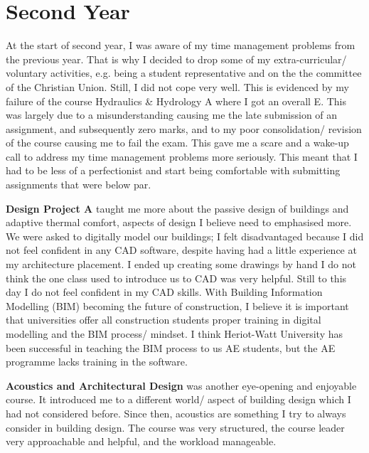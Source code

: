 
\section{Second Year}


At the start of second year, I was aware of my time management problems from the previous year.
That is why I decided to drop some of my extra-curricular/ voluntary activities, e.g. being a student representative and on the the committee of the Christian Union.
Still, I did not cope very well.
This is evidenced by my failure of the course Hydraulics \& Hydrology A where I got an overall E.
This was largely due to a misunderstanding causing me the late submission of an assignment, and subsequently zero marks, and to my poor consolidation/ revision of the course causing me to fail the exam.
This gave me a scare and a wake-up call to address my time management problems more seriously.
This meant that I had to be less of a perfectionist and start being comfortable with submitting assignments that were below par.

\textbf{Design Project A} taught me more about the passive design of buildings and adaptive thermal comfort, aspects of design I believe need to emphasised more.
We were asked to digitally model our buildings; I felt disadvantaged because I did not feel confident in any CAD software, despite having had a little experience at my architecture placement.
I ended up creating some drawings by hand
I do not think the one class used to introduce us to CAD was very helpful.
Still to this day I do not feel confident in my CAD skills.
With Building Information Modelling (BIM) becoming the future of construction, I believe it is important that universities offer all construction students proper training in digital modelling and the BIM process/ mindset.
I think Heriot-Watt University has been successful in teaching the BIM process to us AE students, but the AE programme lacks training in the software.

\textbf{Acoustics and Architectural Design} was another eye-opening and enjoyable course.
It introduced me to a different world/ aspect of building design which I had not considered before.
Since then, acoustics are something I try to always consider in building design.
The course was very structured, the course leader very approachable and helpful, and the workload manageable.


